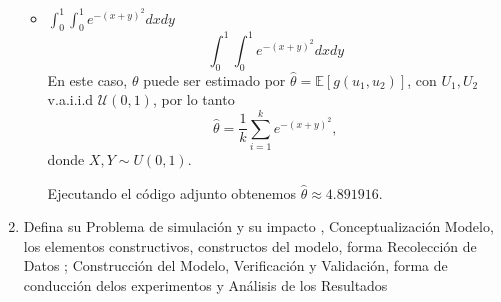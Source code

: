 \documentclass[12pt]{article}
\begin{document}
\begin{enumerate}
\begin{itemize}
                    \item $\displaystyle \int_{0}^{1}\int_{0}^{1}e^{-(x+y)^2}dxdy$
                        \begin{equation}
                            \int_{0}^{1}\int_{0}^{1}e^{-(x+y)^2}dxdy
                        \end{equation}
                        En este caso, $\theta$ puede ser estimado por $\hat{\theta} = \mathbb{E}[g(u_1, u_2)]$,
                        con $U_1, U_2$ v.a.i.i.d $\mathcal{U}(0,1)$, por lo tanto
                        \begin{equation}
                            \hat{\theta} = \frac1k \sum_{i=1}^ke^{-(x+y)^2},
                        \end{equation}
                        donde $X, Y \sim U(0,1)$.
                        
                        Ejecutando el código adjunto obtenemos $\hat{\theta} \approx 4.891916$.                        
                    
                \end{itemize}
            \item  Defina su Problema de simulación y su impacto , Conceptualización
                Modelo, los elementos constructivos, constructos del modelo, forma
                Recolección de Datos ; Construcción del Modelo, Verificación y Validación,
                forma de conducción delos experimentos y Análisis de los Resultados
        \end{enumerate}
        
                
                
\end{document}
